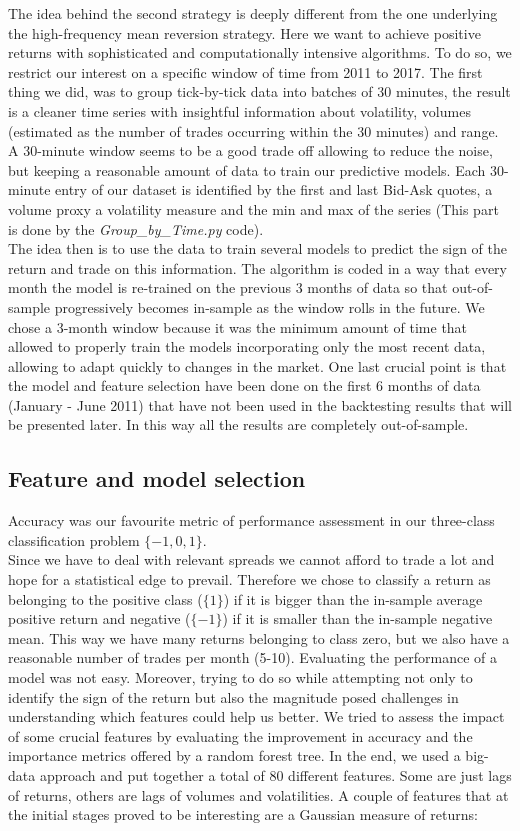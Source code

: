 \documentclass[a4paper]{article}
\begin{document}
The idea behind the second strategy is deeply different from the one underlying the high-frequency mean reversion strategy. Here we want to achieve positive returns with sophisticated and computationally intensive algorithms. To do so, we restrict our interest on a specific window of time from 2011 to 2017. The first thing we did, was to group tick-by-tick data into batches of 30 minutes, the result is a cleaner time series with insightful information about volatility, volumes (estimated as the number of trades occurring within the 30 minutes) and range. A 30-minute window seems to be a good trade off allowing to reduce the noise, but keeping a reasonable amount of data to train our predictive models. Each 30-minute entry of our dataset is identified by the first and last Bid-Ask quotes, a volume proxy a volatility measure and the min and max of the series (This part is done by the \textit{Group\_by\_Time.py} code).\\
The idea then is to use the data to train several models to predict the sign of the return and trade on this information. The algorithm is coded in a way that every month the model is re-trained on the previous 3 months of data so that out-of-sample progressively becomes in-sample as the window rolls in the future. We chose a 3-month window because it was the minimum amount of time that allowed to properly train the models incorporating only the most recent data, allowing to adapt quickly to changes in the market. One last crucial point is that the model and feature selection have been done on the first 6 months of data (January - June 2011) that have not been used in the backtesting results that will be presented later. In this way all the results are completely out-of-sample.

\subsection{Feature and model selection}

Accuracy was our favourite metric of performance assessment in our three-class classification problem $\{-1,0,1\}$.\\ Since we have to deal with relevant spreads we cannot afford to trade a lot and hope for a statistical edge to prevail. Therefore we chose to classify a return as belonging to the positive class ($\{1\}$) if it is bigger than the in-sample average positive return and negative ($\{-1\}$) if it is smaller than the in-sample negative mean. This way we have many returns belonging to class zero, but we also have a reasonable number of trades per month (5-10). Evaluating the performance of a model was not easy. Moreover, trying to do so while attempting not only to identify the sign of the return but also the magnitude posed challenges in understanding which features could help us better. We tried to assess the impact of some crucial features by evaluating the improvement in accuracy and the importance metrics offered by a random forest tree. In the end, we used a big-data approach and put together a total of 80 different features. Some are just lags of returns, others are lags of volumes and volatilities. A couple of features that at the initial stages proved to be interesting are a Gaussian measure of returns:
\end{document}
